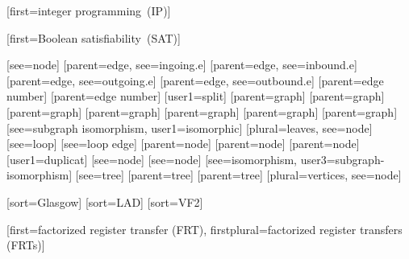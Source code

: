%
        [first={integer programming~(IP)}]

%
        [first={Boolean satisfiability~(SAT)}]

[see={node}]
[parent={edge}, see={ingoing.e}]
[parent={edge}, see={inbound.e}]
[parent={edge}, see={outgoing.e}]
[parent={edge}, see={outbound.e}]
[parent={edge number}]
[parent={edge number}]
[user1={split}]
[parent={graph}]
[parent={graph}]
[parent={graph}]
[parent={graph}]
[parent={graph}]
[parent={graph}]
[parent={graph}]
[see={subgraph isomorphism}, user1={isomorphic}]
[plural={leaves}, see={node}]
[see={loop}]
[see={loop edge}]
[parent={node}]
[parent={node}]
[parent={node}]
[user1={duplicat}]%
[see={node}]
[see={node}]
[see={isomorphism}, user3={subgraph-isomorphism}]
[see={tree}]
[parent={tree}]
[parent={tree}]
[plural={vertices}, see={node}]

[sort={Glasgow}]
[sort={LAD}]
[sort={VF2}]

%
        [first=factorized register transfer (FRT),
         firstplural=factorized register transfers (FRTs)]

